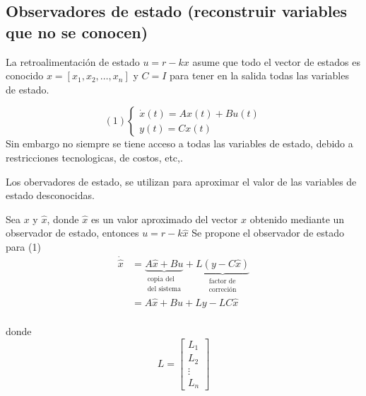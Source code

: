 \subsection{Observadores de estado (reconstruir variables que no se conocen)}

La retroalimentación de estado \( u = r - kx \) asume que todo el vector de estados es conocido \( x = [ x_{1}, x_{2}, \ldots, x_{n} ] \) y \( C=I \) para tener en la salida todas las variables de estado.

\[
    (1)
    \left\{
        \begin{array}{lll}
            \dot{x}(t) = Ax(t) + Bu(t)\\
            y(t) = Cx(t)
        \end{array}
    \right.
\]
Sin embargo no siempre se tiene acceso a todas las variables de estado, debido a restricciones tecnologicas, de costos, etc,.

Los obervadores de estado, se utilizan para aproximar el valor de las variables de estado desconocidas.

Sea \( x \) y \( \hat{x} \), donde \( \hat{x} \) es un valor aproximado del vector \( x \) obtenido mediante un observador de estado, entonces \( u = r - k\hat{x} \)
Se propone el observador de estado para (1)
\[
    \begin{split}
        \dot{\hat{x}} & = 
        \underbrace{A\hat{x} + Bu}_{
            \begin{matrix}
                \text{copia del} \\
                \text{del sistema}
            \end{matrix}}
            +
            \underbrace{L(y-C\hat{x})}_{
            \begin{matrix}
                \text{factor de} \\
                \text{correción}
            \end{matrix}
            }\\
            & = A\hat{x} + Bu + Ly - LC\hat{x}\\
    \end{split}
\]

donde 
\[
    L = 
    \begin{bmatrix}
        L_{1} \\
        L_{2} \\
        \vdots \\
        L_{n}
    \end{bmatrix}
\]

